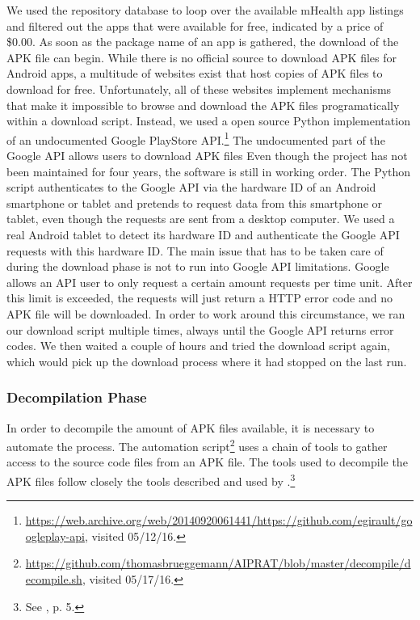 We used the repository database to loop over the available mHealth app listings and filtered out the apps that were available for free, indicated by a price of \$0.00.
As soon as the package name of an app is gathered, the download of the \acs{APK} file can begin. 
While there is no official source to download \acs{APK} files for Android apps, a multitude of websites exist that host copies of \acs{APK} files to download for free.
Unfortunately, all of these websites implement mechanisms that make it impossible to browse and download the APK files programatically within a download script.
Instead, we used a open source Python implementation of an undocumented Google PlayStore \acs{API}.\footnote{\url{https://web.archive.org/web/20140920061441/https://github.com/egirault/googleplay-api}, visited 05/12/16.} 
The undocumented part of the Google API allows users to download APK files 
Even though the project has not been maintained for four years, the software is still in working order.
The Python script authenticates to the Google API via the hardware ID of an Android smartphone or tablet and pretends to request data from this smartphone or tablet, even though the requests are sent from a desktop computer.
We used a real Android tablet to detect its hardware ID and authenticate the Google API requests with this hardware ID.
The main issue that has to be taken care of during the download phase is not to run into Google API limitations. 
Google allows an API user to only request a certain amount requests per time unit. 
After this limit is exceeded, the requests will just return a HTTP error code and no APK file will be downloaded.
In order to work around this circumstance, we ran our download script multiple times, always until the Google API returns error codes. 
We then waited a couple of hours and tried the download script again, which would pick up the download process where it had stopped on the last run.

\subsubsection{Decompilation Phase}

In order to decompile the amount of APK files available, it is necessary to automate the process. 
The automation script\footnote{\url{https://github.com/thomasbrueggemann/AIPRAT/blob/master/decompile/decompile.sh}, visited 05/17/16.} uses a chain of tools to gather access to the source code files from an APK file.
The tools used to decompile the APK files follow closely the tools described and used by \cite{Enck2011}.\footnote{See \cite{Enck2011}, p. 5.}

